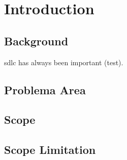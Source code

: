 
\section{Introduction}

\subsection{Background}
\acrlong{sdlc} has always been important (test). 
\subsection{Problema Area}
\subsection{Scope}
\subsection{Scope Limitation}
